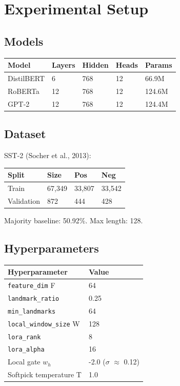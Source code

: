 \section{Experimental Setup}

\subsection{Models}

\begin{table}[H]
\centering
\small
\begin{tabular}{lllll}
\toprule
\textbf{Model} & \textbf{Layers} & \textbf{Hidden} & \textbf{Heads} & \textbf{Params} \\
\midrule
DistilBERT & 6 & 768 & 12 & 66.9M \\
RoBERTa & 12 & 768 & 12 & 124.6M \\
GPT-2 & 12 & 768 & 12 & 124.4M \\
\bottomrule
\end{tabular}
\end{table}

\subsection{Dataset}

SST-2 (Socher et al., 2013):

\begin{table}[H]
\centering
\small
\begin{tabular}{llll}
\toprule
\textbf{Split} & \textbf{Size} & \textbf{Pos} & \textbf{Neg} \\
\midrule
Train & 67,349 & 33,807 & 33,542 \\
Validation & 872 & 444 & 428 \\
\bottomrule
\end{tabular}
\end{table}

Majority baseline: 50.92\%. Max length: 128.

\subsection{Hyperparameters}

\begin{table}[H]
\centering
\small
\begin{tabular}{ll}
\toprule
\textbf{Hyperparameter} & \textbf{Value} \\
\midrule
\texttt{feature\_dim} F & 64 \\
\texttt{landmark\_ratio} & 0.25 \\
\texttt{min\_landmarks} & 64 \\
\texttt{local\_window\_size} W & 128 \\
\texttt{lora\_rank} & 8 \\
\texttt{lora\_alpha} & 16 \\
Local gate $w_h$ & -2.0 ($\sigma$ $\approx$ 0.12) \\
Softpick temperature T & 1.0 \\
\bottomrule
\end{tabular}
\end{table}

